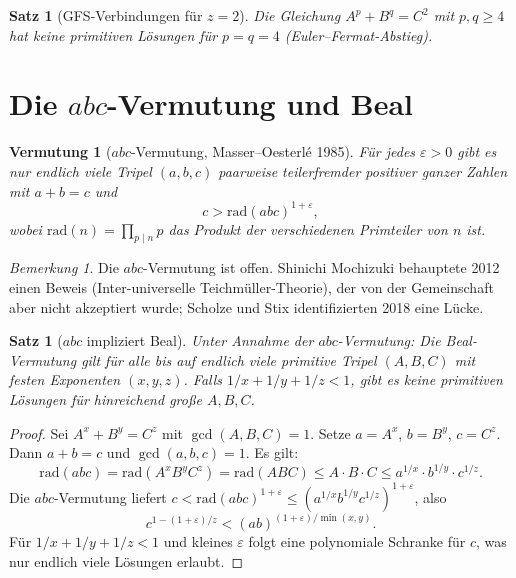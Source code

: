 \documentclass[12pt,a4paper]{amsart}
\newtheorem{satz}[theorem]{Satz}
\newtheorem{vermutung}[theorem]{Vermutung}
\theoremstyle{definition}
\theoremstyle{remark}
\newtheorem{bemerkung}[theorem]{Bemerkung}
\begin{document}
\begin{satz}[GFS-Verbindungen für $z = 2$]\label{satz:z2}
Die Gleichung $A^p + B^q = C^2$ mit $p, q \geq 4$ hat keine primitiven Lösungen
für $p = q = 4$ (Euler--Fermat-Abstieg).
\end{satz}

\section{Die \texorpdfstring{$abc$}{abc}-Vermutung und Beal}

\begin{vermutung}[$abc$-Vermutung, Masser--Oesterlé 1985]\label{verm:abc}
Für jedes $\varepsilon > 0$ gibt es nur endlich viele Tripel $(a,b,c)$ paarweise
teilerfremder positiver ganzer Zahlen mit $a + b = c$ und
\[
  c > \mathrm{rad}(abc)^{1+\varepsilon},
\]
wobei $\mathrm{rad}(n) = \prod_{p \mid n} p$ das Produkt der verschiedenen Primteiler
von $n$ ist.
\end{vermutung}

\begin{bemerkung}
Die $abc$-Vermutung ist offen. Shinichi Mochizuki behauptete 2012 einen Beweis
(Inter-universelle Teichmüller-Theorie), der von der Gemeinschaft aber nicht
akzeptiert wurde; Scholze und Stix identifizierten 2018 eine Lücke.
\end{bemerkung}

\begin{satz}[$abc$ impliziert Beal]\label{satz:abcBeal}
Unter Annahme der $abc$-Vermutung: Die Beal-Vermutung gilt für alle bis auf endlich
viele primitive Tripel $(A, B, C)$ mit festen Exponenten $(x, y, z)$. Falls
$1/x + 1/y + 1/z < 1$, gibt es keine primitiven Lösungen für hinreichend große $A, B, C$.
\end{satz}

\begin{proof}
Sei $A^x + B^y = C^z$ mit $\gcd(A,B,C) = 1$. Setze $a = A^x$, $b = B^y$, $c = C^z$.
Dann $a + b = c$ und $\gcd(a,b,c) = 1$. Es gilt:
\[
  \mathrm{rad}(abc) = \mathrm{rad}(A^x B^y C^z) = \mathrm{rad}(ABC) \leq A \cdot B \cdot C
  \leq a^{1/x} \cdot b^{1/y} \cdot c^{1/z}.
\]
Die $abc$-Vermutung liefert $c < \mathrm{rad}(abc)^{1+\varepsilon} \leq
(a^{1/x} b^{1/y} c^{1/z})^{1+\varepsilon}$, also
\[
  c^{1-(1+\varepsilon)/z} < (ab)^{(1+\varepsilon)/\min(x,y)}.
\]
Für $1/x + 1/y + 1/z < 1$ und kleines $\varepsilon$ folgt eine polynomiale Schranke
für $c$, was nur endlich viele Lösungen erlaubt.
\end{proof}
\end{document}

